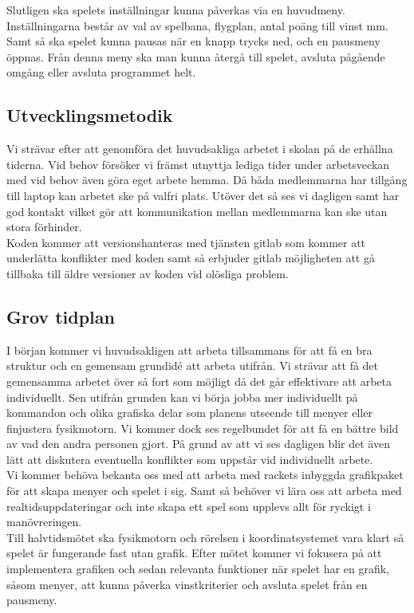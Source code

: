 \documentclass[12pt,a4paper]{article}
\begin{document}
Slutligen ska spelets inställningar kunna påverkas via en huvudmeny. Inställningarna består av val av spelbana, flygplan, antal poäng till vinst mm. Samt så ska spelet kunna pausas när en knapp trycks ned, och en pausmeny öppnas. Från denna meny ska man kunna återgå till spelet, avsluta pågående omgång eller avsluta programmet helt. 


\subsection{Utvecklingsmetodik}
Vi strävar efter att genomföra det huvudsakliga arbetet i skolan på de erhållna tiderna. Vid behov försöker vi främst utnyttja lediga tider under arbetsveckan med vid behov även göra eget arbete hemma. Då båda medlemmarna har tillgång till laptop kan arbetet ske på valfri plats. Utöver det så ses vi dagligen samt har god kontakt vilket gör att kommunikation mellan medlemmarna kan ske utan stora förhinder. \\

Koden kommer att versionshanteras med tjänsten gitlab som kommer att underlätta konflikter med koden samt så erbjuder gitlab möjligheten att gå tillbaka till äldre versioner av koden vid olösliga problem.

\subsection{Grov tidplan}
I början kommer vi huvudsakligen att arbeta tillsammans för att få en bra struktur och en gemensam grundidé att arbeta utifrån. Vi strävar att få det gemensamma arbetet över så fort som möjligt då det går effektivare att arbeta individuellt. Sen utifrån grunden kan vi börja jobba mer individuellt på kommandon och olika grafiska delar som planens utseende till menyer eller finjustera fysikmotorn. Vi kommer dock ses regelbundet för att få en bättre bild av vad den andra personen gjort. På grund av att vi ses dagligen blir det även lätt att diskutera eventuella konflikter som uppstår vid individuellt arbete. \\

Vi kommer behöva bekanta oss med att arbeta med rackets inbyggda grafikpaket för att skapa menyer och spelet i sig. Samt så behöver vi lära oss att arbeta med realtidsuppdateringar och inte skapa ett spel som upplevs allt för ryckigt i manövreringen. \\

Till halvtidsmötet ska fysikmotorn och rörelsen i koordinatsystemet vara klart så spelet är fungerande fast utan grafik. Efter mötet kommer vi fokusera på att implementera grafiken och sedan relevanta funktioner när spelet har en grafik, såsom menyer, att kunna påverka vinstkriterier och avsluta spelet från en pausmeny.
\end{document}
